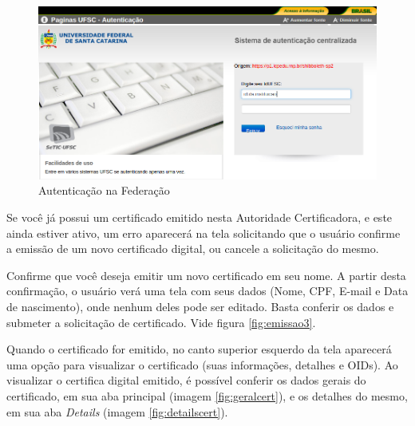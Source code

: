 \begin{figure}[ht]
     \centering
     \includegraphics[scale=0.3]{images/emitir2.png}
     \caption{Autenticação na Federação}
     \label{fig:ufxc2}
\end{figure}

Se você já possui um certificado emitido nesta Autoridade Certificadora, e este ainda estiver ativo, um erro aparecerá na tela solicitando que o usuário confirme a emissão de um novo certificado digital, ou cancele a solicitação do mesmo.

Confirme que você deseja emitir um novo certificado em seu nome. A partir desta confirmação, o usuário verá uma tela com seus dados (Nome, CPF, E-mail e Data de  nascimento), onde nenhum deles pode ser editado. Basta conferir os dados e submeter a solicitação de certificado. Vide figura \ref{fig:emissao3}.

Quando o certificado for emitido, no canto superior esquerdo da tela aparecerá uma opção para visualizar o certificado (suas informações, detalhes e OIDs). Ao visualizar o certifica digital emitido, é possível conferir os dados gerais do certificado, em sua aba principal (imagem \ref{fig:geralcert}), e os detalhes do mesmo, em sua aba \textit{Details} (imagem \ref{fig:detailscert}).


